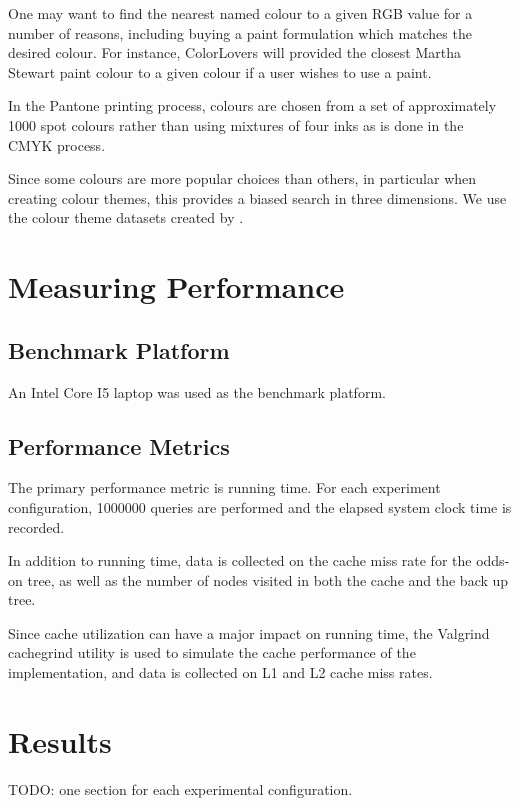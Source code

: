 \documentclass[mcs]{scsthesis}
\begin{document}
One may want to find the nearest named colour to a given RGB value for
a number of reasons, including buying a paint formulation which matches the
desired colour.  For instance, ColorLovers will provided the closest Martha
Stewart paint colour to a given colour if a user wishes to use a paint.

In the Pantone \cite{pantone} printing process, colours are chosen from a set of
approximately 1000 spot colours rather than using mixtures of four inks as is
done in the CMYK process.

Since some colours are more popular choices than others, in particular when
creating colour themes, this provides a biased search in three dimensions. We
use the colour theme datasets created by \cite{colorthemes}.

\section{Measuring Performance}

\subsection{Benchmark Platform}

An Intel Core I5 laptop was used as the benchmark platform.

\subsection{Performance Metrics}

The primary performance metric is running time.  For each experiment
configuration, 1000000 queries are performed and the elapsed system clock
time is recorded.

In addition to running time, data is collected on the cache miss rate for the
odds-on tree, as well as the number of nodes visited in both the cache and the
back up tree.

Since cache utilization can have a major impact on running time, the Valgrind
\cite{valgrind} cachegrind utility is used to simulate the cache performance
of the implementation, and data is collected on L1 and L2 cache miss rates.

\section{Results}

TODO: one section for each experimental configuration.
\end{document}
